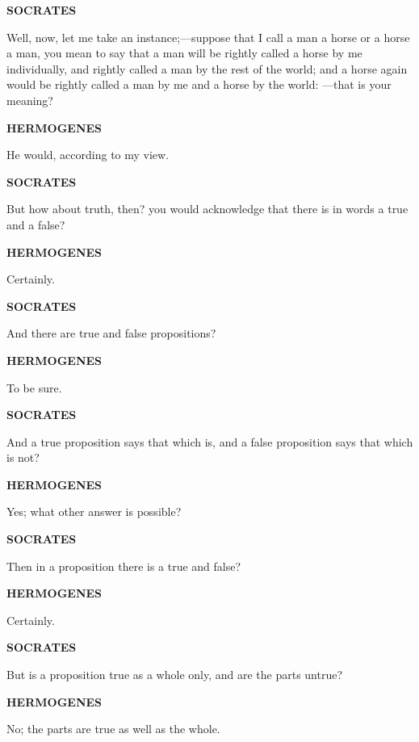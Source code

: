 \documentclass[11pt,letter]{article}
\begin{document}
\par \textbf{SOCRATES}
\par   Well, now, let me take an instance;—suppose that I call a man a horse or a horse a man, you mean to say that a man will be rightly called a horse by me individually, and rightly called a man by the rest of the world; and a horse again would be rightly called a man by me and a horse by the world: —that is your meaning?

\par \textbf{HERMOGENES}
\par   He would, according to my view.

\par \textbf{SOCRATES}
\par   But how about truth, then? you would acknowledge that there is in words a true and a false?

\par \textbf{HERMOGENES}
\par   Certainly.

\par \textbf{SOCRATES}
\par   And there are true and false propositions?

\par \textbf{HERMOGENES}
\par   To be sure.

\par \textbf{SOCRATES}
\par   And a true proposition says that which is, and a false proposition says that which is not?

\par \textbf{HERMOGENES}
\par   Yes; what other answer is possible?

\par \textbf{SOCRATES}
\par   Then in a proposition there is a true and false?

\par \textbf{HERMOGENES}
\par   Certainly.

\par \textbf{SOCRATES}
\par   But is a proposition true as a whole only, and are the parts untrue?

\par \textbf{HERMOGENES}
\par   No; the parts are true as well as the whole.
\end{document}
